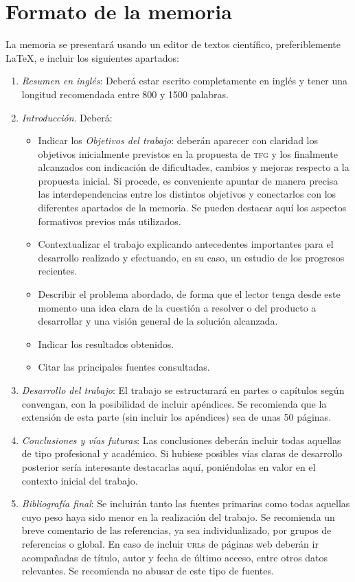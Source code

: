 \section{Formato de la memoria}
La memoria se presentará usando un editor de textos científico, preferiblemente \LaTeX, e incluir los siguientes apartados:
\begin{enumerate}
    \item \emph{Resumen en inglés}: Deberá estar escrito completamente en inglés y tener una longitud recomendada entre 800 y 1500 palabras.
    \item \emph{Introducción}. Deberá:
          \begin{itemize}
              \item Indicar los \emph{Objetivos del trabajo}: deberán aparecer con claridad los objetivos inicialmente previstos en la propuesta de \textsc{tfg} y los finalmente alcanzados con indicación de dificultades, cambios y mejoras respecto a la propuesta inicial. Si procede, es conveniente apuntar de manera precisa las interdependencias entre los distintos objetivos y conectarlos con los diferentes apartados de la memoria. Se pueden destacar aquí los aspectos formativos previos más utilizados.
              \item Contextualizar el trabajo explicando antecedentes importantes para el desarrollo realizado y efectuando, en su caso, un estudio de los progresos recientes.
              \item Describir el problema abordado, de forma que el lector tenga desde este momento una idea clara de la cuestión a resolver o del producto a desarrollar y una visión general de la solución alcanzada.
              \item Indicar los resultados obtenidos.
              \item Citar las principales fuentes consultadas.
          \end{itemize}

    \item \emph{Desarrollo del trabajo}: El trabajo se estructurará en partes o capítulos según convengan, con la posibilidad de incluir apéndices. Se recomienda que la extensión de esta parte (sin incluir los apéndices) sea de unas 50 páginas.

    \item \emph{Conclusiones y vías futuras}: Las conclusiones deberán incluir todas aquellas de tipo profesional y académico. Si hubiese posibles vías claras de desarrollo posterior sería interesante destacarlas aquí, poniéndolas en valor en el contexto inicial del trabajo.

    \item \emph{Bibliografía final}: Se incluirán tanto las fuentes primarias como todas aquellas cuyo peso haya sido menor en la realización del trabajo. Se recomienda un breve comentario de las referencias, ya sea individualizado, por grupos de referencias o global. En caso de incluir \textsc{url}s de páginas web deberán ir acompañadas de título, autor y fecha de último acceso, entre otros datos relevantes. Se recomienda no abusar de este tipo de fuentes.
\end{enumerate}




